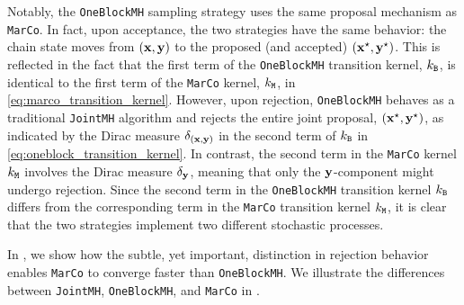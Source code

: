 \documentclass[onefignum,onetabnum]{siamonline250211}
\newcommand{\bfx}{{\bf x}}
\newcommand{\bfy}{{\bf y}}
\newcommand{\MarCo}{\textnormal{\texttt{MarCo}}\xspace}
\newcommand{\Joint}{\textnormal{\texttt{JointMH}}\xspace}
\newcommand{\OneblockMCMC}{\textnormal{\texttt{OneBlockMH}}\xspace}
\begin{document}
Notably, the \OneblockMCMC sampling strategy uses the same proposal mechanism as \MarCo. In fact, upon acceptance, the two strategies have the same behavior: the chain state moves from $(\bfx,\bfy)$ to the proposed (and accepted) $(\bfx^\star,\bfy^\star)$. This is reflected in the fact that
%
%
%
the first term of the \OneblockMCMC transition kernel, $k_{\tt B}$, is identical to the first term of the \MarCo kernel, $k_{\tt M}$, in \eqref{eq:marco_transition_kernel}. 
However, upon rejection, \OneblockMCMC behaves as a traditional \Joint algorithm and rejects the entire joint proposal, $(\bfx^\star, \bfy^\star)$, as indicated by the Dirac measure $\delta_{(\bfx,\bfy)}$ in the second term of $k_{\tt B}$ in \eqref{eq:oneblock_transition_kernel}. %
In contrast, the second term in the \MarCo kernel $k_{\tt M}$ involves the Dirac measure $\delta_{\bfy}$, meaning that only the $\bfy$-component might undergo rejection.
Since the second term in the \OneblockMCMC transition kernel $k_{\tt B}$ differs from the corresponding term in the \MarCo transition kernel $k_{\tt M}$, it is clear that the two strategies implement two different stochastic processes.

In , we show how the subtle, yet important, distinction in rejection behavior enables \MarCo to converge faster than \OneblockMCMC. 
We illustrate the differences between \Joint, \OneblockMCMC, and \MarCo in .  

%
%
%
%
%
%
%
%
%
%
\end{document}
